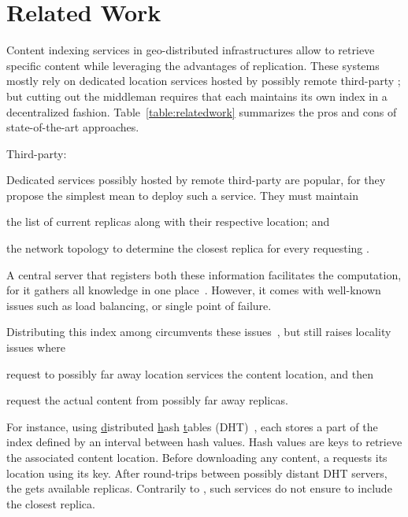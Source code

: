 
\section{Related Work}
\label{sec:related_work}

Content indexing services in geo-distributed infrastructures allow
\processes to retrieve specific content while leveraging the
advantages of replication. These systems mostly rely on dedicated
location services hosted by possibly remote third-party \processes;
but cutting out the middleman requires that each \process maintains
its own index in a decentralized
fashion. Table~\ref{table:relatedwork} summarizes the pros and cons of
state-of-the-art approaches.

\begin{asparadesc}
\item [Third-party:]

Dedicated services possibly hosted by remote third-party \processes
are popular, for they propose the simplest mean to deploy such a
service. They must maintain
\begin{inparaenum}[(i)]
\item the list of current replicas along with their respective
  location; and
\item the network topology to determine the closest replica for every
  requesting \process.
\end{inparaenum}

\noindent A central server that registers both these information
facilitates the computation, for it gathers all knowledge in one
place~\cite{snamp,p2p-oracle,fogstore,p2p-alto}. However, it comes with
well-known issues such as load balancing, or single point of failure.

\noindent Distributing this index among \processes circumvents these
issues~\cite{voronet,ipfs,mdht,squirrel,triukose2011measuring,coin_19}, but still raises locality issues where \processes
\begin{inparaenum}[(i)]
\item request to possibly far away location services the content
  location, and then
\item request the actual content from possibly far away replicas.
\end{inparaenum}
For instance, using \underline{d}istributed \underline{h}ash
\underline{t}ables (DHT)~\cite{ipfs,mdht,squirrel}, each \process
stores a part of the index defined by an interval between hash values.
Hash values are keys to retrieve the associated content location.
Before downloading any content, a \node requests its location using
its key. After round-trips between possibly distant DHT servers, the
\node gets available replicas. Contrarily to \NAME, such services do
not ensure to include the closest replica.


\end{asparadesc}

